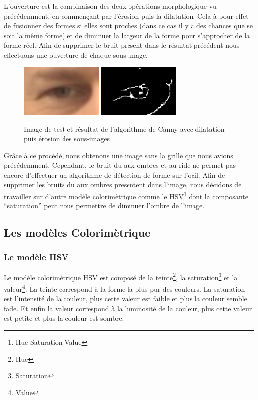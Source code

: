 L'ouverture est la combinaison des deux opérations morphologique vu précédemment, en commençant par 
l'érosion puis la dilatation. Cela à pour effet de fusionner des formes si elles sont proches (dans ce
cas il y a des chances que se soit la même forme) et de diminuer la largeur de la forme pour 
s'approcher de la forme réel. Afin de supprimer le bruit présent dans le résultat précédent nous effectuons une ouverture
de chaque sous-image.

\begin{figure}[H]
 \center
 \includegraphics[width=4cm]{image/original.png}
 \includegraphics[width=4cm]{image/canny_final.png}
 \caption{Image de test et résultat de l'algorithme de Canny avec dilatation puis érosion des sous-images}
\end{figure}

Grâce à ce procédé, nous obtenons une image sans la grille que nous avions précédemment. Cependant,
le bruit du aux ombres et au ride ne permet pas encore d'effectuer un algorithme de détection de forme
sur l'oeil. Afin de supprimer les bruits du aux ombres presentent dans l'image, nous décidons de travailler sur d'autre modèle
colorimètrique comme le HSV\footnote{Hue Saturation Value} dont la composante \enquote{saturation} peut nous
permettre de diminuer l'ombre de l'image.

\subsection{Les modèles Colorimètrique}
\subsubsection{Le modèle HSV}
Le modèle colorimètrique HSV est composé de la teinte\footnote{Hue}, la saturation\footnote{Saturation} et la valeur\footnote{Value}.
La teinte correspond à la forme la plus pur des couleurs. La saturation est l'intensité de la couleur, plus cette valeur est faible
et plus la couleur semble fade. Et enfin la valeur correspond à la luminosité de la couleur, plus cette valeur est petite et plus la
couleur est sombre.\\

